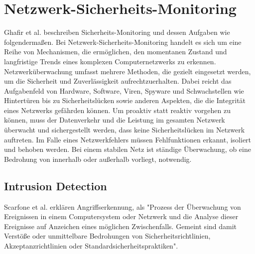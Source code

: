 \section{Netzwerk-Sicherheits-Monitoring}
Ghafir et al. \cite{ghafir_network_2015} beschreiben Sicherheits-Monitoring und dessen Aufgaben wie folgendermaßen. Bei Netzwerk-Sicherheits-Monitoring handelt es sich um eine Reihe von Mechanismen, die ermöglichen, den momentanen Zustand und langfristige Trends eines komplexen Computernetzwerks zu erkennen. Netzwerküberwachung umfasst mehrere Methoden, die gezielt eingesetzt werden, um die Sicherheit und Zuverlässigkeit aufrechtzuerhalten. Dabei reicht das Aufgabenfeld von Hardware, Software, Viren, Spyware und Schwachstellen wie Hintertüren bis zu Sicherheitslücken sowie anderen Aspekten, die die Integrität eines Netzwerks gefährden können. Um proaktiv statt reaktiv vorgehen zu können, muss der Datenverkehr und die Leistung im gesamten Netzwerk überwacht und sichergestellt werden, dass keine Sicherheitslücken im Netzwerk auftreten. Im Falle eines Netzwerkfehlers müssen Fehlfunktionen erkannt, isoliert und behoben werden. Bei einem stabilen Netz ist ständige Überwachung, ob eine Bedrohung von innerhalb oder außerhalb vorliegt, notwendig.
\subsection{Intrusion Detection}
Scarfone et al. \cite{scarfone2007guide} erklären Angriffserkennung, als "Prozess der Überwachung von Ereignissen in einem Computersystem oder Netzwerk und die Analyse dieser Ereignisse auf Anzeichen eines möglichen Zwischenfalls. Gemeint sind damit Verstöße oder unmittelbare Bedrohungen von Sicherheitsrichtlinien, Akzeptanzrichtlinien oder Standardsicherheitspraktiken".
